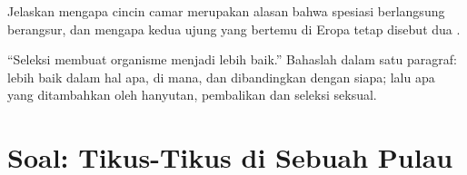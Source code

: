 \begin{exercise}[$\star\star\star$]\label{exo:g12:selection-drift-speciation:14}
Jelaskan mengapa  cincin camar merupakan alasan bahwa spesiasi
berlangsung berangsur, dan mengapa kedua ujung yang bertemu di Eropa
tetap disebut dua .
\end{exercise}

\begin{exercise}[$\star\star\star$]\label{exo:g12:selection-drift-speciation:15}
``Seleksi membuat organisme menjadi lebih baik.'' Bahaslah dalam satu
paragraf: lebih baik dalam hal apa, di mana, dan dibandingkan dengan
siapa; lalu apa yang ditambahkan oleh hanyutan, pembalikan dan seleksi
seksual.
\end{exercise}

\section{Soal: Tikus-Tikus di Sebuah Pulau}

